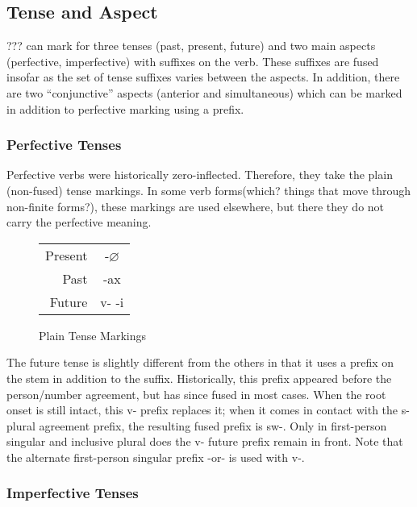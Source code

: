 \documentclass[12pt]{book} %
\begin{document}
\subsection{Tense and Aspect}

??? can mark for three tenses (past, present, future) and two main aspects (perfective, imperfective) with suffixes on the verb.
These suffixes are fused insofar as the set of tense suffixes varies between the aspects.
In addition, there are two ``conjunctive'' aspects (anterior and simultaneous) which can be marked in addition to perfective marking using a prefix.

\subsubsection{Perfective  Tenses}

Perfective verbs were historically zero-inflected.
Therefore, they take the plain (non-fused) tense markings.
{\color{orange}In some verb forms{\color{red}(which? things that move through non-finite forms?)}, these markings are used elsewhere, but there they do not carry the perfective meaning.}

\begin{figure}[H]
\centering
    \begin{tabular}{rc}
        Present & -$\varnothing$    \\
        Past        & -ax   \\
        Future  & v- -i \\
    \end{tabular}
\caption{Plain Tense Markings}\label{t:plain-tense}
\end{figure}

The future tense is slightly different from the others in that it uses a prefix on the stem in addition to the suffix.
Historically, this prefix appeared before the person/number agreement, but has since fused in most cases.
When the root onset is still intact, this v- prefix replaces it; when it comes in contact with the s- plural agreement prefix, the resulting fused prefix is sw-.
Only in first-person singular and inclusive plural does the v- future prefix remain in front.
Note that the alternate first-person singular prefix -or- is used with v-.


\subsubsection{Imperfective Tenses}
\end{document}
